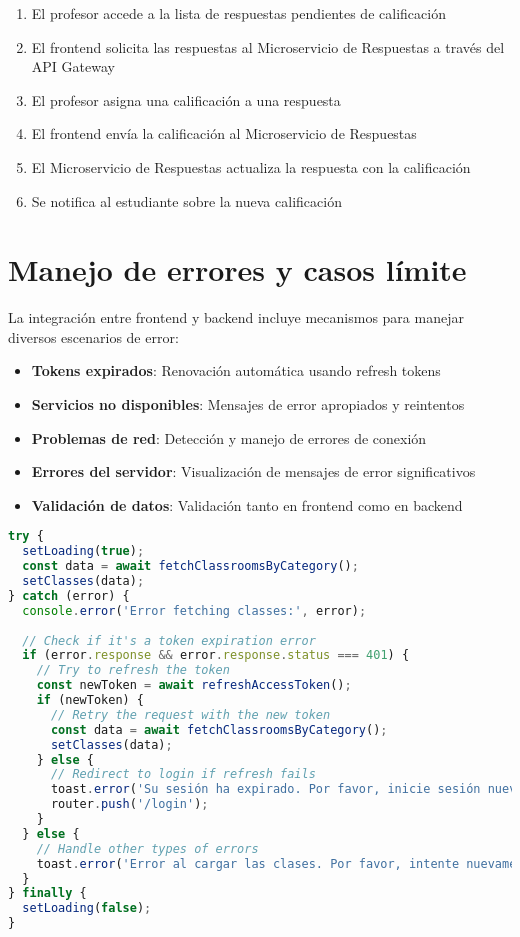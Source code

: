 \documentclass[12pt,a4paper]{report}
\begin{document}
\begin{enumerate}
    \item El profesor accede a la lista de respuestas pendientes de calificación
    \item El frontend solicita las respuestas al Microservicio de Respuestas a través del API Gateway
    \item El profesor asigna una calificación a una respuesta
    \item El frontend envía la calificación al Microservicio de Respuestas
    \item El Microservicio de Respuestas actualiza la respuesta con la calificación
    \item Se notifica al estudiante sobre la nueva calificación
\end{enumerate}

\section{Manejo de errores y casos límite}
La integración entre frontend y backend incluye mecanismos para manejar diversos escenarios de error:

\begin{itemize}
    \item \textbf{Tokens expirados}: Renovación automática usando refresh tokens
    \item \textbf{Servicios no disponibles}: Mensajes de error apropiados y reintentos
    \item \textbf{Problemas de red}: Detección y manejo de errores de conexión
    \item \textbf{Errores del servidor}: Visualización de mensajes de error significativos
    \item \textbf{Validación de datos}: Validación tanto en frontend como en backend
\end{itemize}

\begin{lstlisting}[language=JavaScript, caption=Manejo de errores en el frontend]
try {
  setLoading(true);
  const data = await fetchClassroomsByCategory();
  setClasses(data);
} catch (error) {
  console.error('Error fetching classes:', error);
  
  // Check if it's a token expiration error
  if (error.response && error.response.status === 401) {
    // Try to refresh the token
    const newToken = await refreshAccessToken();
    if (newToken) {
      // Retry the request with the new token
      const data = await fetchClassroomsByCategory();
      setClasses(data);
    } else {
      // Redirect to login if refresh fails
      toast.error('Su sesión ha expirado. Por favor, inicie sesión nuevamente.');
      router.push('/login');
    }
  } else {
    // Handle other types of errors
    toast.error('Error al cargar las clases. Por favor, intente nuevamente.');
  }
} finally {
  setLoading(false);
}
\end{lstlisting}
\end{document}
